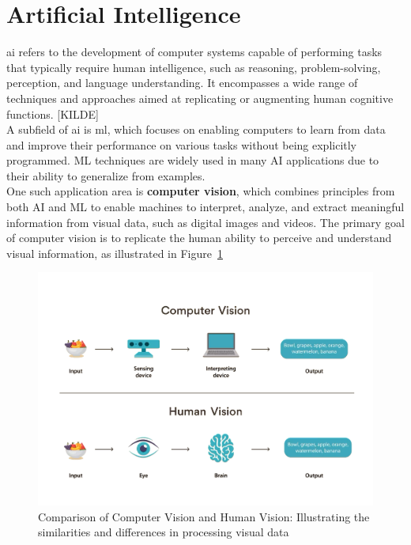 \section{Artificial Intelligence} \label{sec:machine-learning}

\gls{ai} refers to the development of computer systems capable of performing tasks that typically require human intelligence, such as reasoning, problem-solving, perception, and language understanding. It encompasses a wide range of techniques and approaches aimed at replicating or augmenting human cognitive functions. [KILDE] \\

A subfield of \gls{ai} is \gls{ml}, which focuses on enabling computers to learn from data and improve their performance on various tasks without being explicitly programmed. ML techniques are widely used in many AI applications due to their ability to generalize from examples. \\

One such application area is \textbf{computer vision}, which combines principles from both AI and ML to enable machines to interpret, analyze, and extract meaningful information from visual data, such as digital images and videos. The primary goal of computer vision is to replicate the human ability to perceive and understand visual information, as illustrated in Figure~\ref{fig:computer-vision}



\begin{figure}[h!] \centering \includegraphics[width=0.75\linewidth]{figures/theory/machine-learning/computer-vision.png} \caption[Computer vision vs. human vision]{Comparison of Computer Vision and Human Vision: Illustrating the similarities and differences in processing visual data \cite{turing:computer-vision}} \label{fig:computer-vision} \end{figure}

